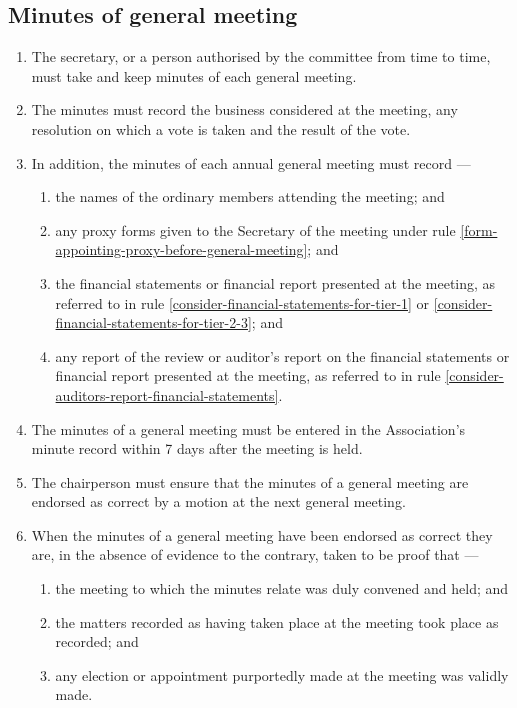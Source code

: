 \documentclass[../constitution.tex]{subfiles}
\begin{document}
\hypertarget{minutes-of-general-meeting}{%
  \subsection{Minutes of general meeting}\label{minutes-of-general-meeting}}

\begin{enumerate}

  \item The secretary, or a person authorised by the committee from time to time, must take and keep minutes of each general meeting.
  \item The minutes must record the business considered at the meeting, any resolution on which a vote is taken and the result of the vote.
  \item In addition, the minutes of each annual general meeting must record ---

        \begin{enumerate}

          \item the names of the ordinary members attending the meeting; and
          \item any proxy forms given to the Secretary of the meeting under rule \ref{form-appointing-proxy-before-general-meeting}; and
          \item the financial statements or financial report presented at the meeting, as referred to in rule \ref{consider-financial-statements-for-tier-1} or \ref{consider-financial-statements-for-tier-2-3}; and
          \item any report of the review or auditor's report on the financial statements or financial report presented at the meeting, as referred to in rule \ref{consider-auditors-report-financial-statements}.
        \end{enumerate}
  \item The minutes of a general meeting must be entered in the Association's minute record within 7 days after the meeting is held.
  \item The chairperson must ensure that the minutes of a general meeting are endorsed as correct by a motion at the next general meeting.



  \item When the minutes of a general meeting have been endorsed as correct they are, in the absence of evidence to the contrary, taken to be proof that ---

        \begin{enumerate}

          \item the meeting to which the minutes relate was duly convened and held; and
          \item the matters recorded as having taken place at the meeting took place as recorded; and
          \item any election or appointment purportedly made at the meeting was validly made.
        \end{enumerate}
\end{enumerate}
\end{document}
